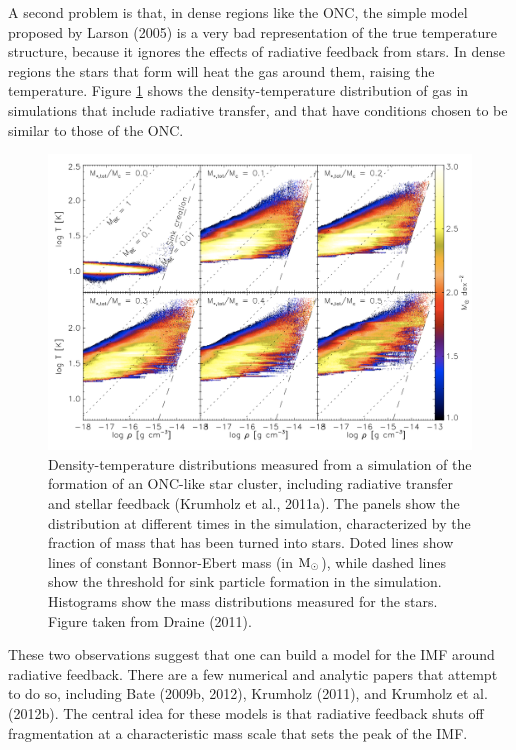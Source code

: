 \documentclass[a4paper,10pt]{article}
\begin{document}
{\noindent}A second problem is that, in dense regions like the ONC, the simple model proposed by Larson (2005) is a very bad representation of the true temperature structure, because it ignores the effects of radiative feedback from stars. In dense regions the stars that form will heat the gas around them, raising the temperature. Figure \ref{fig:tvsrho_feedback} shows the density-temperature distribution of gas in simulations that include radiative transfer, and that have conditions chosen to be similar to those of the ONC.

\begin{figure}[t]
    \centering
    \includegraphics[width=16cm]{figures/TvsRho_feeback.png}
    \caption{\footnotesize{Density-temperature distributions measured from a simulation of the formation of an ONC-like star cluster, including radiative transfer and stellar feedback (Krumholz et al., 2011a). The panels show the distribution at different times in the simulation, characterized by the fraction of mass that has been turned into stars. Doted lines show lines of constant Bonnor-Ebert mass (in ${\rm M_\odot}$), while dashed lines show the threshold for sink particle formation in the simulation. Histograms show the mass distributions measured for the stars. Figure taken from Draine (2011).}}
    \label{fig:tvsrho_feedback}
\end{figure}

{\noindent}These two observations suggest that one can build a model for the IMF around radiative feedback. There are a few numerical and analytic papers that attempt to do so, including Bate (2009b, 2012), Krumholz (2011), and Krumholz et al. (2012b). The central idea for these models is that radiative feedback shuts off fragmentation at a characteristic mass scale that sets the peak of the IMF.
\end{document}
